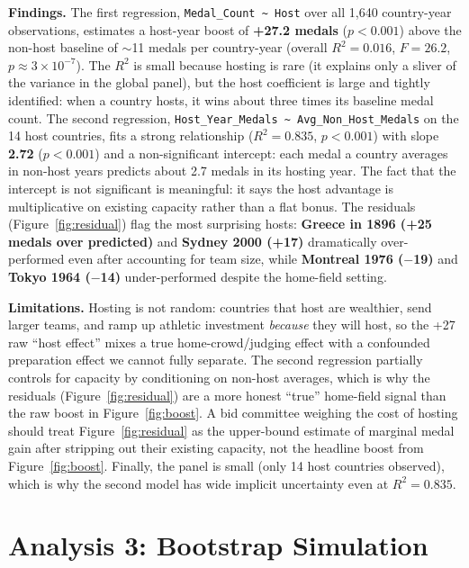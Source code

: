 \documentclass[11pt]{article}
\begin{document}
\textbf{Findings.} The first regression, \texttt{Medal\_Count \textasciitilde{} Host} over all 1{,}640 country-year observations, estimates a host-year boost of \textbf{+27.2 medals} ($p < 0.001$) above the non-host baseline of $\sim$11 medals per country-year (overall $R^2 = 0.016$, $F = 26.2$, $p \approx 3 \times 10^{-7}$). The $R^2$ is small because hosting is rare (it explains only a sliver of the variance in the global panel), but the host coefficient is large and tightly identified: when a country hosts, it wins about three times its baseline medal count. The second regression, \texttt{Host\_Year\_Medals \textasciitilde{} Avg\_Non\_Host\_Medals} on the 14 host countries, fits a strong relationship ($R^2 = 0.835$, $p < 0.001$) with slope \textbf{2.72} ($p < 0.001$) and a non-significant intercept: each medal a country averages in non-host years predicts about 2.7 medals in its hosting year. The fact that the intercept is not significant is meaningful: it says the host advantage is multiplicative on existing capacity rather than a flat bonus. The residuals (Figure~\ref{fig:residual}) flag the most surprising hosts: \textbf{Greece in 1896 (+25 medals over predicted)} and \textbf{Sydney 2000 (+17)} dramatically over-performed even after accounting for team size, while \textbf{Montreal 1976 ($-$19)} and \textbf{Tokyo 1964 ($-$14)} under-performed despite the home-field setting.

\textbf{Limitations.} Hosting is not random: countries that host are wealthier, send larger teams, and ramp up athletic investment \textit{because} they will host, so the +27 raw ``host effect'' mixes a true home-crowd/judging effect with a confounded preparation effect we cannot fully separate. The second regression partially controls for capacity by conditioning on non-host averages, which is why the residuals (Figure~\ref{fig:residual}) are a more honest ``true'' home-field signal than the raw boost in Figure~\ref{fig:boost}. A bid committee weighing the cost of hosting should treat Figure~\ref{fig:residual} as the upper-bound estimate of marginal medal gain after stripping out their existing capacity, not the headline boost from Figure~\ref{fig:boost}. Finally, the panel is small (only 14 host countries observed), which is why the second model has wide implicit uncertainty even at $R^2 = 0.835$.

\section*{Analysis 3: Bootstrap Simulation}
\end{document}
